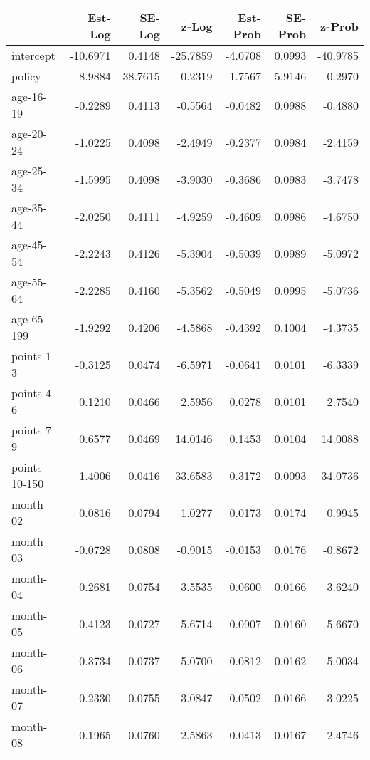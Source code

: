 \documentclass[10pt]{article}
\begin{document}

\begin{table}[ht]
\centering
\begin{tabular}{lrrrrrr}
  \hline
 & Est-Log & SE-Log & z-Log & Est-Prob & SE-Prob & z-Prob \\ 
  \hline
intercept & -10.6971 & 0.4148 & -25.7859 & -4.0708 & 0.0993 & -40.9785 \\ 
  policy & -8.9884 & 38.7615 & -0.2319 & -1.7567 & 5.9146 & -0.2970 \\ 
  age-16-19 & -0.2289 & 0.4113 & -0.5564 & -0.0482 & 0.0988 & -0.4880 \\ 
  age-20-24 & -1.0225 & 0.4098 & -2.4949 & -0.2377 & 0.0984 & -2.4159 \\ 
  age-25-34 & -1.5995 & 0.4098 & -3.9030 & -0.3686 & 0.0983 & -3.7478 \\ 
  age-35-44 & -2.0250 & 0.4111 & -4.9259 & -0.4609 & 0.0986 & -4.6750 \\ 
  age-45-54 & -2.2243 & 0.4126 & -5.3904 & -0.5039 & 0.0989 & -5.0972 \\ 
  age-55-64 & -2.2285 & 0.4160 & -5.3562 & -0.5049 & 0.0995 & -5.0736 \\ 
  age-65-199 & -1.9292 & 0.4206 & -4.5868 & -0.4392 & 0.1004 & -4.3735 \\ 
  points-1-3 & -0.3125 & 0.0474 & -6.5971 & -0.0641 & 0.0101 & -6.3339 \\ 
  points-4-6 & 0.1210 & 0.0466 & 2.5956 & 0.0278 & 0.0101 & 2.7540 \\ 
  points-7-9 & 0.6577 & 0.0469 & 14.0146 & 0.1453 & 0.0104 & 14.0088 \\ 
  points-10-150 & 1.4006 & 0.0416 & 33.6583 & 0.3172 & 0.0093 & 34.0736 \\ 
  month-02 & 0.0816 & 0.0794 & 1.0277 & 0.0173 & 0.0174 & 0.9945 \\ 
  month-03 & -0.0728 & 0.0808 & -0.9015 & -0.0153 & 0.0176 & -0.8672 \\ 
  month-04 & 0.2681 & 0.0754 & 3.5535 & 0.0600 & 0.0166 & 3.6240 \\ 
  month-05 & 0.4123 & 0.0727 & 5.6714 & 0.0907 & 0.0160 & 5.6670 \\ 
  month-06 & 0.3734 & 0.0737 & 5.0700 & 0.0812 & 0.0162 & 5.0034 \\ 
  month-07 & 0.2330 & 0.0755 & 3.0847 & 0.0502 & 0.0166 & 3.0225 \\ 
  month-08 & 0.1965 & 0.0760 & 2.5863 & 0.0413 & 0.0167 & 2.4746 \\ 

\end{tabular}
\end{table}
\end{document}
